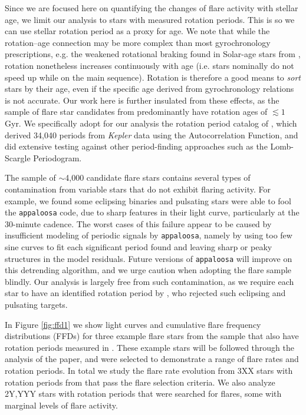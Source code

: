 \documentclass[preprint2]{aastex62}
\newcommand{\Kepler}{\textsl{Kepler}\xspace}
\begin{document}
Since we are focused here on quantifying the changes of flare activity with stellar age, we limit our analysis to stars with measured rotation periods. This is so we can use stellar rotation period as a proxy for age. We note that while the rotation--age connection may be more complex than most gyrochronology prescriptions, e.g. the weakened rotational braking found in Solar-age stars from \citet{van-saders2016}, rotation nonetheless increases continuously with age (i.e. stars nominally do not speed up while on the main sequence). Rotation is therefore a good means to {\it sort} stars by their age, even if the specific age derived from gyrochronology relations is not accurate. Our work here is further insulated from these effects, as the sample of flare star candidates from \citet{davenport2016} predominantly have rotation ages of $\lesssim 1$ Gyr. We specifically adopt for our analysis the rotation period catalog of \citet{mcquillan2014}, which derived 34,040 periods from \Kepler data using the Autocorrelation Function, and did extensive testing against other period-finding approaches such as the Lomb-Scargle Periodogram. 


The \citet{davenport2016} sample of $\sim$4,000 candidate flare stars contains several types of contamination from variable stars that do not exhibit flaring activity. For example, we found some eclipsing binaries and pulsating stars were able to fool the {\tt appaloosa} code, due to sharp features in their light curve, particularly at the 30-minute cadence. The worst cases of this failure appear to be caused by insufficient modeling of periodic signals by {\tt appaloosa}, namely by using too few sine curves to fit each significant period found and leaving sharp or peaky structures in the model residuals. Future versions of {\tt appaloosa} will improve on this detrending algorithm, and we urge caution when adopting the \citet{davenport2016} flare sample blindly. Our analysis is largely free from such contamination, as we require each star to have an identified rotation period by \citet{mcquillan2014}, who rejected such eclipsing and pulsating targets.



In Figure \ref{fig:ffd1} we show light curves and cumulative flare frequency distributions (FFDs) for three example flare stars from the \citet{davenport2016} sample that also have rotation periods measured in \citet{mcquillan2014}. These example stars will be followed through the analysis of the paper, and were selected to demonstrate a range of flare rates and rotation periods. In total we study the flare rate evolution from 3XX stars with rotation periods from \citet{mcquillan2014} that pass the \citet{davenport2016} flare selection criteria. We also analyze 2Y,YYY stars with rotation periods that were searched for flares, some with marginal levels of flare activity.
\end{document}
